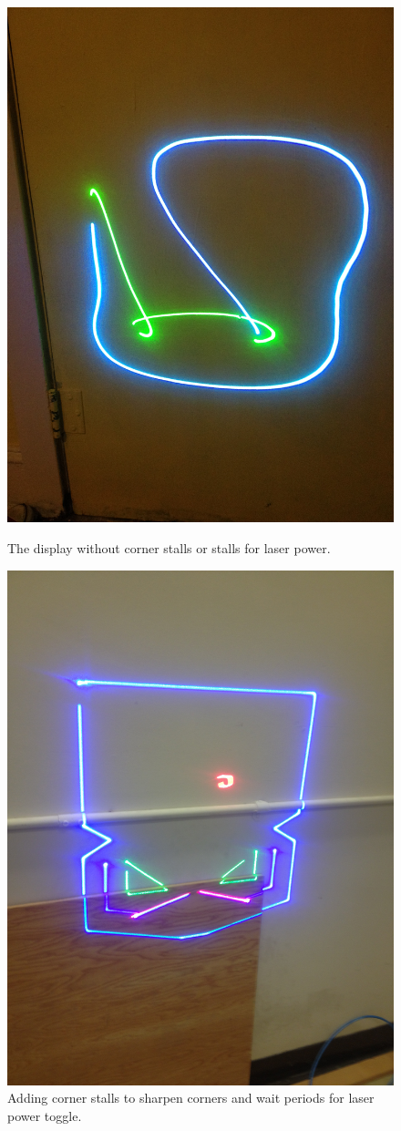 \documentclass{article}
\begin{document}
\begin{figure}[H]
\centering
\begin{minipage}{.5\textwidth}
  \captionsetup{width=0.8\textwidth}
  \centering
  \includegraphics[width=.6\linewidth]{laser_loopy}
  \caption{The display without corner stalls or stalls for laser power.}
  \label{fig:loopy}
\end{minipage}%
\begin{minipage}{.5\textwidth}
  \captionsetup{width=0.8\textwidth}
  \centering
  \includegraphics[width=.6\linewidth]{laser_success}
  \caption{Adding corner stalls to sharpen corners and wait periods for laser power toggle.}
\end{minipage}
\end{figure}
\end{document}
